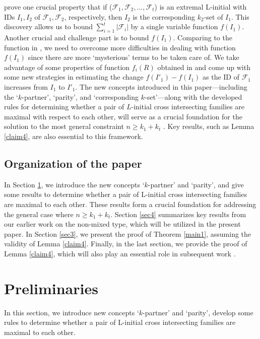 \documentclass[a4paper,11pt]{article}
\begin{document}
  prove one crucial property that
  if ($\mathcal{F}_1, \mathcal{F}_2, \dots, \mathcal{F}_t$) is  an extremal L-initial with IDs $I_1, I_2$ of $\mathcal{F}_1, \mathcal{F}_2$, respectively, then $I_2$  is the corresponding $k_2$-set of $I_1$. This discovery allows us to bound $\sum_{i=1}^t{|\mathcal{F}_i|}$ by a single variable function $f(I_1)$. Another crucial and challenge part is  to bound $f(I_1)$. Comparing to the function in  \cite{HP+}, we need to overcome more difficulties in dealing with  function $f(I_1)$ since there are more `mysterious' terms to be taken care of.
  We take advantage of some properties of function $f_i(R)$  obtained in \cite{HP+} and come up with some new strategies in estimating the change $f(I'_1)-f(I_1)$ as the ID of $\mathcal{F}_1$ increases from $I_1$ to $I'_1$.
The new concepts introduced in this paper—including the `$k$-partner', `parity', and `corresponding $k$-set'—along with the developed rules for determining whether a pair of $L$-initial cross intersecting families are maximal with respect to each other, will serve as a crucial foundation for the solution to the most general constraint $n\ge k_1+k_t$ . Key results, such as Lemma \ref{claim4},
are also essential to this framework.

\subsection{Organization of the paper}

In Section \ref{sec2}, we introduce the new concepts `$k$-partner' and `parity', and give some results  to determine whether  a pair of L-initial cross intersecting families are maximal to each other.
These results form a crucial foundation for addressing the general case where $n \ge k_1 + k_t$.
Section \ref{sec4} summarizes key results from our earlier work on the non-mixed type, which will be utilized in the present paper.
 In Section \ref{sec3}, we present the proof of Theorem \ref{main1}, assuming the validity of Lemma \ref{claim4}.
 Finally, in the last section, we provide the proof of Lemma \ref{claim4}, which will also play an essential role  in subsequent work \cite{hpgeneral}.



\section{Preliminaries}  \label{sec2}
In this section, we introduce new concepts `$k$-partner' and `parity', develop some rules to determine whether a pair of  L-initial cross intersecting families are maximal to each other.
\end{document}
